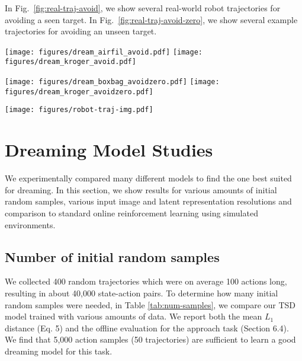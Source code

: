 \documentclass[letterpaper, 10 pt, conference]{ieeeconf}
\begin{document}
In Fig.~\ref{fig:real-traj-avoid}, we show several real-world robot trajectories for avoiding a seen target. In Fig.~\ref{fig:real-traj-avoid-zero}, we show several example trajectories for avoiding an unseen target.

\begin{figure*}
    \centering
      \texttt{[image: figures/dream\_airfil\_avoid.pdf]}
      \texttt{[image: figures/dream\_kroger\_avoid.pdf]}
      \caption{Trajectories on the avoiding task taken by the robot in the real world for various seen targets. To make this task more challenging, the target was placed on average 0.6 meters away from the robot. }
      \label{fig:real-traj-avoid}
\end{figure*}\begin{figure*}
    \centering
      \texttt{[image: figures/dream\_boxbag\_avoidzero.pdf]}
      \texttt{[image: figures/dream\_kroger\_avoidzero.pdf]}
      \caption{Trajectories on the avoiding task taken by the robot in the real world for unseen targets. To make this task more challenging, the target was placed on average 0.6 meters away from the robot. }
      \label{fig:real-traj-avoid-zero}
\end{figure*}\begin{figure*}
    \centering
      \texttt{[image: figures/robot-traj-img.pdf]}
      \caption{A real-world trajectory annotated with the robot's point of view.}
      \label{fig:real-loc}
\end{figure*}\section{Dreaming Model Studies}
We experimentally compared many different models to find the one best suited for dreaming. In this section, we show results for various amounts of initial random samples, various input image and latent representation resolutions and comparison to standard online reinforcement learning using simulated environments.

\subsection{Number of initial random samples}
We collected 400 random trajectories which were on average 100 actions long, resulting in about 40,000 state-action pairs. To determine how many initial random samples were needed, in Table \ref{tab:num-samples}, we compare our TSD model trained with various amounts of data. We report both the mean $L_1$ distance (Eq. 5) and the offline evaluation for the approach task (Section 6.4). We find that  5,000 action samples (50 trajectories) are sufficient to learn a good dreaming model for this task.
\end{document}
